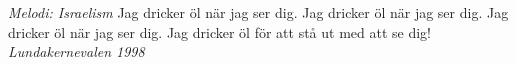 {\footnotesize\textit{Melodi: Israelism}}
\vspace{10pt}
Jag dricker öl när jag ser dig.
Jag dricker öl när jag ser dig.
Jag dricker öl när jag ser dig.
Jag dricker öl för att stå ut med att se dig!
\vspace{10pt}
{\footnotesize\textit{Lundakernevalen 1998}}

